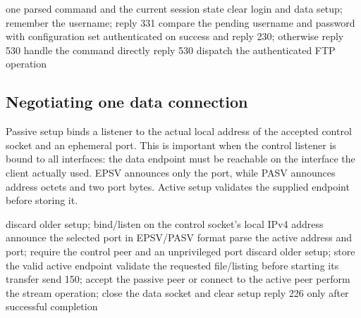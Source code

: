 \begin{algorithm}[H]\small
\caption{Authentication and request routing}
\begin{algorithmic}[1]
\Require one parsed command and the current session state
 \State clear login and data setup; remember the username; reply 331
 \State compare the pending username and password with configuration
 \State set authenticated on success and reply 230; otherwise reply 530
 \State handle the command directly
 \State reply 530
\Else
 \State dispatch the authenticated FTP operation
\EndIf
\end{algorithmic}
\end{algorithm}



\subsection{Negotiating one data connection}
Passive setup binds a listener to the actual local address of the accepted control socket and an ephemeral port. This is important when the control listener is bound to all interfaces: the data endpoint must be reachable on the interface the client actually used. EPSV announces only the port, while PASV announces address octets and two port bytes. Active setup validates the supplied endpoint before storing it.

\begin{algorithm}[H]\small
\caption{Prepare and consume a data endpoint}
\begin{algorithmic}[1]
 \State discard older setup; bind/listen on the control socket's local IPv4 address
 \State announce the selected port in EPSV/PASV format
\Else
 \State parse the active address and port; require the control peer and an unprivileged port
 \State discard older setup; store the valid active endpoint
\EndIf
\State validate the requested file/listing before starting its transfer
\State send 150; accept the passive peer or connect to the active peer
\State perform the stream operation; close the data socket and clear setup
\State reply 226 only after successful completion
\end{algorithmic}
\end{algorithm}

